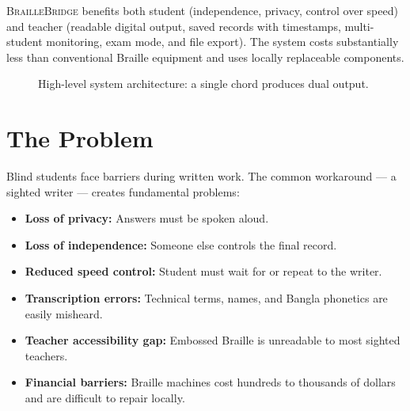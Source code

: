 \documentclass[11pt,a4paper,twoside]{article}
\newcommand{\projectname}{\textsc{BrailleBridge}}
\begin{document}
\projectname{} benefits both student (independence, privacy, control over
speed) and teacher (readable digital output, saved records with timestamps,
multi-student monitoring, exam mode, and file export). The system costs
substantially less than conventional Braille equipment and uses locally
replaceable components.

\begin{figure}[H]\centering
{}
\caption{High-level system architecture: a single chord produces dual output.}
\end{figure}

\section{The Problem}

Blind students face barriers during written work. The common workaround ---
a sighted writer --- creates fundamental problems:

\begin{itemize}[nosep]
  \item \textbf{Loss of privacy:} Answers must be spoken aloud.
  \item \textbf{Loss of independence:} Someone else controls the final record.
  \item \textbf{Reduced speed control:} Student must wait for or repeat to the writer.
  \item \textbf{Transcription errors:} Technical terms, names, and Bangla
    phonetics are easily misheard.
  \item \textbf{Teacher accessibility gap:} Embossed Braille is unreadable to
    most sighted teachers.
  \item \textbf{Financial barriers:} Braille machines cost hundreds to thousands
    of dollars and are difficult to repair locally.
\end{itemize}
\end{document}
